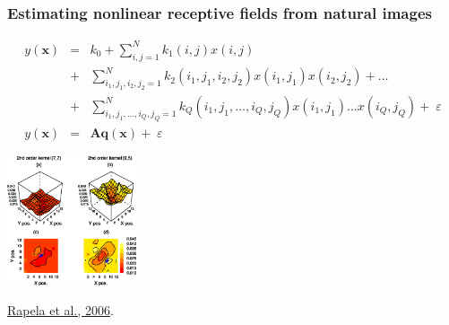 \begin{frame}
    \frametitle{Estimating nonlinear receptive fields from natural images}

    \tiny
    \begin{eqnarray}
        y(\mathbf{x})&=&k_{0}+\sum_{i,j=1}^{N}k_{1}(i, j)x(i, j)\label{eq:volterraSpatial}\\
        &+&\sum_{i_{1},j_{1},i_{2},j_{2}=1}^{N}k_{2}(i_{1},j_{1},i_{2},j_{2})x(i_{1},j_{1})x(i_{2},j_{2})+\ldots\nonumber\\
        &+&\sum_{i_{1},j_{1},\ldots,i_{Q},j_{Q}=1}^{N}k_{Q}(i_{1},j_{1},\ldots,i_{Q},j_{Q})x(i_{1},j_{1})\ldots
        x(i_{Q},j_{Q})+\;\varepsilon\nonumber\\
        y(\mathbf{x})&=&\mathbf{Aq(x)}+\;\varepsilon
    \end{eqnarray}

		\begin{center}
			\includegraphics[width=1.5in]{figures/jov-6-4-11-fig020.png}
		\end{center}
        \hfill\scriptsize\href{https://jov.arvojournals.org/article.aspx?articleid=2192869}{Rapela et al., 2006}.

\end{frame}

